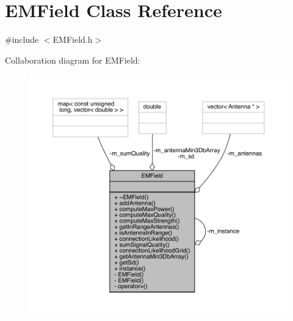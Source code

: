 \hypertarget{class_e_m_field}{}\section{E\+M\+Field Class Reference}
\label{class_e_m_field}


{\ttfamily \#include $<$E\+M\+Field.\+h$>$}



Collaboration diagram for E\+M\+Field\+:
\nopagebreak
\begin{figure}[H]
\begin{center}
\leavevmode
\includegraphics[width=350pt]{class_e_m_field__coll__graph}
\end{center}
\end{figure}

